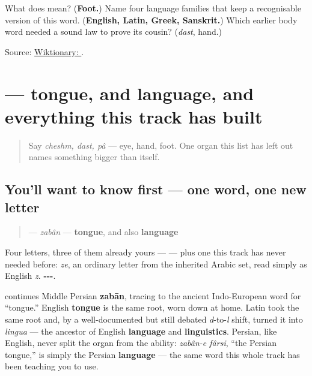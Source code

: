 \begin{tcolorbox}[breakable,colback=teal!4,colframe=teal!35!black,title={Before you move on}]
What does \textbf{} mean? (\textbf{Foot.}) Name four language families that keep a recognisable version of this word. (\textbf{English, Latin, Greek, Sanskrit.}) Which earlier body word needed a sound law to prove its cousin? (\emph{dast}, hand.)

Source: \href{https://en.wiktionary.org/wiki/\%D9\%BE\%D8\%A7}{Wiktionary: }.
\end{tcolorbox}
\section[\texorpdfstring{\fa{زبان} (zabân)}{زبان (zabân)}]{ — tongue, and language, and everything this track has built}

\label{lesson:FA-C11-zaban}



\begin{quote}
Say \emph{cheshm, dast, pâ} — eye, hand, foot. One organ this list has left out names something bigger than itself.
\end{quote}

\subsection*{You'll want to know first — one word, one new letter}
\begin{quote}
\textbf{} — \emph{zabân} — \textbf{tongue}, and also \textbf{language}
\end{quote}

Four letters, three of them already yours — \textbf{  } — plus one this track has never needed before: \textbf{} \emph{ze}, an ordinary letter from the inherited Arabic set, read simply as English \emph{z}. \textbf{---}.

\begin{cousinweb}
\textbf{} continues Middle Persian \textbf{zabān}, tracing to the ancient Indo-European word for “tongue.” English \textbf{tongue} is the same root, worn down at home. Latin took the same root and, by a well-documented but still debated \emph{d}-to-\emph{l} shift, turned it into \emph{lingua} — the ancestor of English \textbf{language} and \textbf{linguistics}. Persian, like English, never split the organ from the ability: \emph{zabân-e fârsi}, “the Persian tongue,” is simply the Persian \textbf{language} — the same word this whole track has been teaching you to use.
\end{cousinweb}

